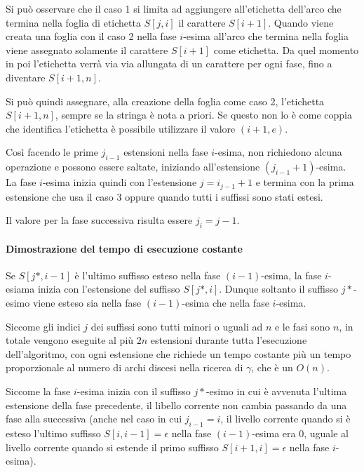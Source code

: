 Si può osservare che il caso 1 si limita ad aggiungere all'etichetta dell'arco che termina nella foglia di etichetta $S[j,i]$ il carattere $S[i+1]$. Quando viene creata una foglia con il caso 2 nella fase $i$-esima all'arco che termina nella foglia viene assegnato solamente il carattere $S[i+1]$ come etichetta. Da quel momento in poi l'etichetta verrà via via allungata di un carattere per ogni fase, fino a diventare $S[i+1,n]$.

Si può quindi assegnare, alla creazione della foglia come caso 2, l'etichetta $S[i+1,n]$, sempre se la stringa è nota a priori. Se questo non lo è come coppia che identifica l'etichetta è possibile utilizzare il valore $(i+1,e)$.

Così facendo le prime $j_{i-1}$ estensioni nella fase $i$-esima, non richiedono alcuna operazione e possono essere saltate, iniziando all'estensione $(j_{i-1}+1)$-esima. La fase $i$-esima inizia quindi con l'estensione $j = i_{j-1}+1$ e termina con la prima estensione che usa il caso 3 oppure quando tutti i suffissi sono stati estesi.

Il valore per la fase successiva risulta essere $j_i = j-1$.

\paragraph{Dimostrazione del tempo di esecuzione costante}

Se $S[j*, i-1]$ è l'ultimo suffisso esteso nella fase $(i-1)$-esima, la fase $i$-esiama inizia con l'estensione del suffisso $S[j*,i]$. Dunque soltanto il suffisso $j*$-esimo viene esteso sia nella fase $(i-1)$-esima che nella fase $i$-esima.

Siccome gli indici $j$ dei suffissi sono tutti minori o uguali ad $n$ e le fasi sono $n$, in totale vengono eseguite al più $2n$ estensioni durante tutta l'esecuzione dell'algoritmo, con ogni estensione che richiede un tempo costante più un tempo proporzionale al numero di archi discesi nella ricerca di $\gamma$, che è un $O(n)$.

Siccome la fase $i$-esima inizia con il suffisso $j*$-esimo in cui è avvenuta l'ultima estensione della fase precedente, il libello corrente non cambia passando da una fase alla successiva (anche nel caso in cui $j_{i-1}=i$, il livello corrente quando si è esteso l'ultimo suffisso $S[i,i-1] = \epsilon$ nella fase $(i-1)$-esima era 0, uguale al livello corrente quando si estende il primo suffisso $S[i+1,i] = \epsilon$ nella fase $i$-esima).

